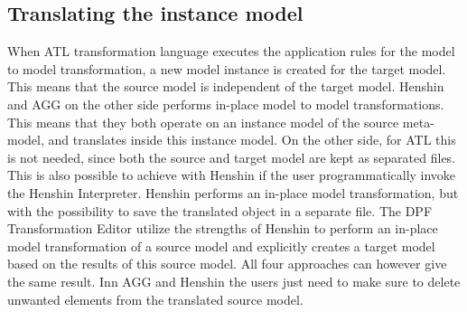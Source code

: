 \subsection{Translating the instance model}

When ATL transformation language executes the application rules for the model to
model transformation, a new model instance is created for the target model. This
means that the source model is independent of the target model. Henshin
and AGG on the other side performs in-place model to model transformations. This
means that they both operate on an instance model of the source meta-model, and translates
inside this instance model. On the other side, for ATL this is not needed, since
both the source and target model are kept as separated files. This is also
possible to achieve with Henshin if the user programmatically invoke the
Henshin Interpreter. Henshin performs an in-place model transformation, but
with the possibility to save the translated object in a separate file. The DPF
Transformation Editor utilize the strengths of Henshin to perform an in-place
model transformation of a source model and explicitly creates a target model
based on the results of this source model. All four approaches can however give
the same result. Inn AGG and Henshin the users just need to make sure to delete
unwanted elements from the translated source model.
